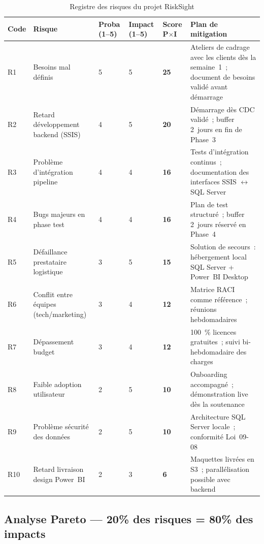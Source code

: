 \documentclass[12pt, a4paper]{report}
\begin{document}
\begin{table}[H]
\centering
\caption{Registre des risques du projet RiskSight}
\label{tab:risques}
\renewcommand{\arraystretch}{1}
\begin{tabularx}{\textwidth}{p{0.7cm} p{3.5cm} p{1.2cm} p{1.2cm} p{1.2cm} X}
\toprule
\rowcolor{primary!12}
Code & Risque & Proba (1--5) & Impact (1--5) & Score P$\times$I & Plan de mitigation \\
\midrule
R1 & Besoins mal définis & 5 & 5 & \textbf{25} & Ateliers de cadrage avec les clients dès la semaine~1~; document de besoins validé avant démarrage \\
R2 & Retard développement backend (SSIS) & 4 & 5 & \textbf{20} & Démarrage dès CDC validé~; buffer 2~jours en fin de Phase~3 \\
R3 & Problème d'intégration pipeline & 4 & 4 & \textbf{16} & Tests d'intégration continus~; documentation des interfaces SSIS $\leftrightarrow$SQL Server \\
R4 & Bugs majeurs en phase test & 4 & 4 & \textbf{16} & Plan de test structuré~; buffer 2~jours réservé en Phase~4 \\
R5 & Défaillance prestataire logistique & 3 & 5 & \textbf{15} & Solution de secours~: hébergement local SQL Server + Power~BI Desktop \\
R6 & Conflit entre équipes (tech/marketing) & 3 & 4 & \textbf{12} & Matrice RACI comme référence~; réunions hebdomadaires \\
R7 & Dépassement budget & 3 & 4 & \textbf{12} & 100~\% licences gratuites~; suivi bi-hebdomadaire des charges \\
R8 & Faible adoption utilisateur & 2 & 5 & \textbf{10} & Onboarding accompagné~; démonstration live dès la soutenance \\
R9 & Problème sécurité des données & 2 & 5 & \textbf{10} & Architecture SQL Server locale~; conformité Loi~09-08~\cite{loi0908} \\
R10 & Retard livraison design Power~BI & 2 & 3 & \textbf{6} & Maquettes livrées en S3~; parallélisation possible avec backend \\
\bottomrule
\end{tabularx}
\end{table}



\subsection{Analyse Pareto --- 20\% des risques = 80\% des impacts}
\end{document}
